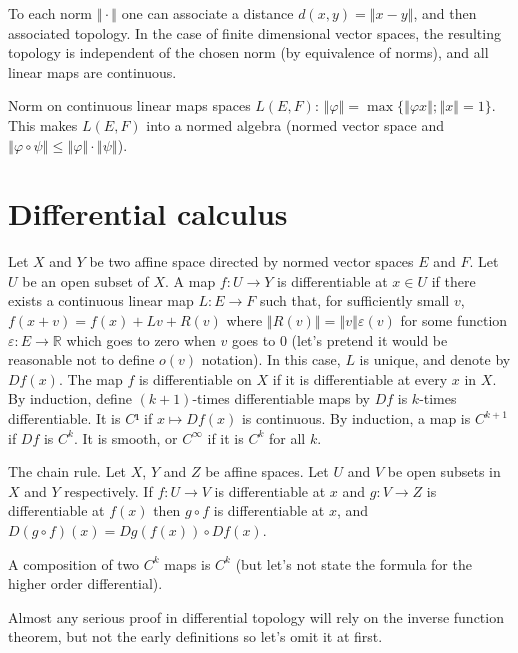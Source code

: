 \documentclass{article}
\begin{document}
To each norm $‖·‖$ one can associate a distance $d(x, y) = ‖x - y‖$, and
then associated topology. In the case of finite dimensional vector
spaces, the resulting topology is independent of the chosen norm (by
equivalence of norms), and all linear maps are continuous.

Norm on continuous linear maps spaces $L(E, F)$: 
$‖φ‖ = \max \{‖φx‖ ; ‖x‖ = 1\}$. This makes $L(E, F)$ into a normed
algebra (normed vector space and $‖φ ∘ ψ‖ ≤ ‖φ‖·‖ψ‖$). 

\section{Differential calculus}
\label{sec:differential_calculus}

Let $X$ and $Y$ be two affine space directed by normed vector spaces
$E$ and $F$. Let $U$ be an open subset of $X$. A map $f : U → Y$ is
differentiable at $x ∈ U$ if there exists a continuous linear map 
$L : E → F$ such that, for sufficiently small $v$,
$f(x + v) = f(x) + Lv + R(v)$ where $‖R(v)‖ = ‖v‖ε(v)$ for some function 
$ε : E → ℝ$ which goes to zero when $v$ goes to $0$ (let's pretend it
would be reasonable not to define $o(v)$ notation). In this case, $L$ is
unique, and denote by $Df(x)$. The map $f$ is differentiable on $X$ if
it is differentiable at every $x$ in $X$. By induction, define
$(k+1)$-times differentiable maps by $Df$ is $k$-times differentiable.
It is $C¹$ if $x ↦ Df(x)$ is continuous. By induction, a map is
$C^{k+1}$ if $Df$ is $C^k$. It is smooth, or $C^∞$ if it is $C^k$ for
all $k$. 

The chain rule. Let $X$, $Y$ and $Z$ be affine spaces. Let $U$ and $V$
be open subsets in $X$ and $Y$ respectively. If $f : U → V$ is
differentiable at $x$ and $g : V → Z$ is differentiable at $f(x)$ then
$g ∘ f$ is differentiable at $x$, and $D(g ∘ f)(x) = Dg(f(x)) ∘ Df(x)$.

A composition of two $C^k$ maps is $C^k$ (but let's not state the
formula for the higher order differential).

Almost any serious proof in differential topology will rely on the
inverse function theorem, but not the early definitions so let's omit it
at first.
\end{document}
